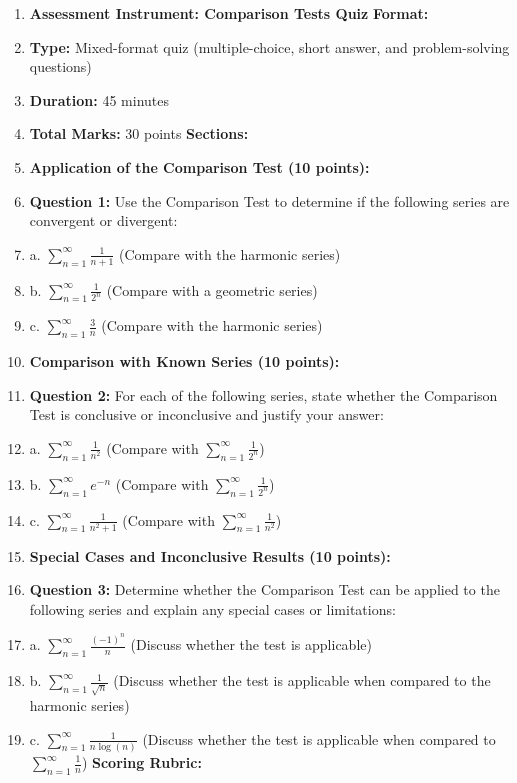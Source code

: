 \begin{enumerate}
    \item \textbf{Assessment Instrument: Comparison Tests Quiz} \textbf{Format:}
    \item \textbf{Type:} Mixed-format quiz (multiple-choice, short answer, and problem-solving questions)
    \item \textbf{Duration:} 45 minutes
    \item \textbf{Total Marks:} 30 points \textbf{Sections:}
    \item \textbf{Application of the Comparison Test (10 points):}
    \item \textbf{Question 1:} Use the Comparison Test to determine if the following series are convergent or divergent:
    \item a. $\sum_{n=1}^{\infty} \frac{1}{n+1}$ (Compare with the harmonic series)
    \item b. $\sum_{n=1}^{\infty} \frac{1}{2^n}$ (Compare with a geometric series)
    \item c. $\sum_{n=1}^{\infty} \frac{3}{n}$ (Compare with the harmonic series)
    \item \textbf{Comparison with Known Series (10 points):}
    \item \textbf{Question 2:} For each of the following series, state whether the Comparison Test is conclusive or inconclusive and justify your answer:
    \item a. $\sum_{n=1}^{\infty} \frac{1}{n^2}$ (Compare with $\sum_{n=1}^{\infty} \frac{1}{2^n}$)
    \item b. $\sum_{n=1}^{\infty} e^{-n}$ (Compare with $\sum_{n=1}^{\infty} \frac{1}{2^n}$)
    \item c. $\sum_{n=1}^{\infty} \frac{1}{n^2 + 1}$ (Compare with $\sum_{n=1}^{\infty} \frac{1}{n^2}$)
    \item \textbf{Special Cases and Inconclusive Results (10 points):}
    \item \textbf{Question 3:} Determine whether the Comparison Test can be applied to the following series and explain any special cases or limitations:
    \item a. $\sum_{n=1}^{\infty} \frac{(-1)^n}{n}$ (Discuss whether the test is applicable)
    \item b. $\sum_{n=1}^{\infty} \frac{1}{\sqrt{n}}$ (Discuss whether the test is applicable when compared to the harmonic series)
    \item c. $\sum_{n=1}^{\infty} \frac{1}{n \log(n)}$ (Discuss whether the test is applicable when compared to $\sum_{n=1}^{\infty} \frac{1}{n}$) \textbf{Scoring Rubric:}

\end{enumerate}
